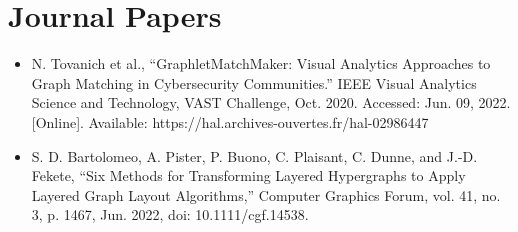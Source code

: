 \section*{Journal Papers}

\begin{itemize}
    \item N. Tovanich et al., “GraphletMatchMaker: Visual Analytics Approaches to Graph Matching in Cybersecurity Communities.” IEEE Visual Analytics Science and Technology, VAST Challenge, Oct. 2020. Accessed: Jun. 09, 2022. [Online]. Available: https://hal.archives-ouvertes.fr/hal-02986447
    \item S. D. Bartolomeo, A. Pister, P. Buono, C. Plaisant, C. Dunne, and J.-D. Fekete, “Six Methods for Transforming Layered Hypergraphs to Apply Layered Graph Layout Algorithms,” Computer Graphics Forum, vol. 41, no. 3, p. 1467, Jun. 2022, doi: 10.1111/cgf.14538.
\end{itemize}
